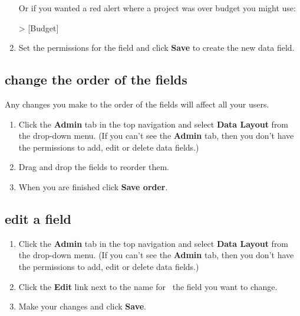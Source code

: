 \documentclass{ctrlo-int-toc}
\begin{document}
\begin{admin}
\begin{enumerate}
Or if you wanted a red alert where a project was over budget you might use: \newline

\begin{code}
 > [Budget]
\end{code}

\item Set the permissions for the field and click \textbf{Save} to create the new data field. 
\end{enumerate}
\subsection[change the order of the fields]{change the order of the fields}
Any changes you make to the order of the fields will affect all your users. 

\begin{enumerate}
\item Click the \textbf{Admin} tab in the top navigation and select \textbf{Data Layout} from the drop-down menu. (If you can't see the \textbf{Admin} tab, then you don't have the permissions to add, edit or delete data fields.)
\item Drag and drop the fields to reorder them. 
\item When you are finished click \textbf{Save order}.
\end{enumerate}
\subsection[edit a field]{edit a field}
\begin{enumerate}
\item Click the \textbf{Admin} tab in the top navigation and select \textbf{Data Layout} from the drop-down menu. (If you can't see the \textbf{Admin} tab, then you don't have the permissions to add, edit or delete data fields.)
\item Click the \textbf{Edit} link next to the name for \ the field you want to change.
\item Make your changes and click \textbf{Save}.
\end{enumerate}

\bigskip


\end{admin}
\end{document}
